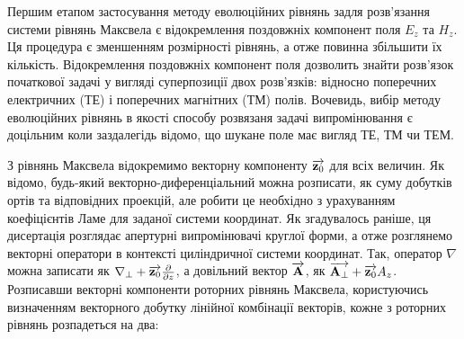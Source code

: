 Першим етапом застосування методу еволюційних рівнянь задля розв'язання системи
рівнянь Максвела є відокремлення поздовжніх компонент поля $ E_z $ та $ H_z $.
Ця процедура є зменшенням розмірності рівнянь, а отже повинна збільшити їх 
кількість. Відокремлення поздовжніх компонент поля дозволить знайти розв'язок 
початкової задачі у вигляді суперпозиції двох розв'язків: відносно поперечних 
електричних (ТЕ) і поперечних магнітних (ТМ) полів. Вочевидь, вибір методу 
еволюційних рівнянь в якості способу розвязаня задачі випромінювання є 
доцільним коли заздалегідь відомо, що шукане поле має вигляд ТЕ, ТМ чи ТЕМ. 



З рівнянь Максвела відокремимо векторну компоненту $ \overrightarrow{\mathbf z_0} $ для всіх 
величин. Як відомо, будь-який векторно-диференціальний можна 
розписати, як суму добутків ортів та відповідних проекцій, але робити це 
необхідно з урахуванням коефіцієнтів Ламе \cite{imp:Korn1974} для заданої 
системи координат. Як згадувалось раніше, ця дисертація розглядає апертурні 
випромінювачі круглої форми, а отже розглянемо векторні оператори в контексті 
циліндричної системи координат. Так, оператор $ \nabla $ можна записати як 
$ \nabla_\perp + \overrightarrow{\mathbf z_0} \frac{\partial }{\partial z} $, а довільний вектор
$ \overrightarrow{\mathbf A} $, як $ \overrightarrow{\mathbf A_\perp} + \overrightarrow{\mathbf z_0} A_z $. Розписавши векторні 
компоненти роторних рівнянь Максвела, користуючись визначенням векторного 
добутку лінійної комбінації векторів, кожне з роторних рівнянь розпадеться 
на два:

